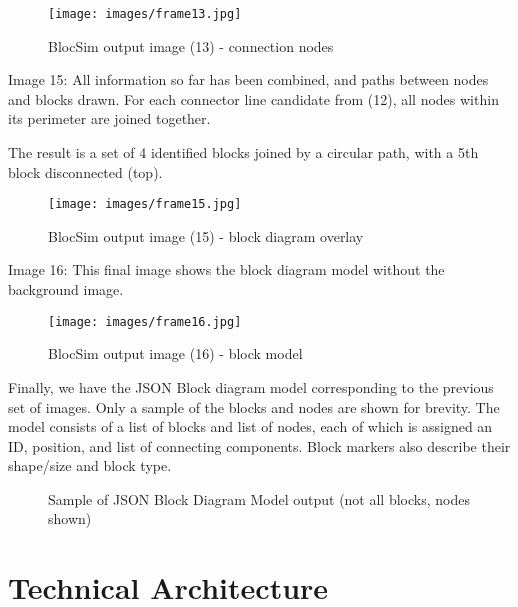 \begin{figure}[ht!]
\centering
\texttt{[image: images/frame13.jpg]}
\caption{BlocSim output image (13) - connection nodes \cite{blocsim}}
\label{im:frame13}
\end{figure}

\newpage
Image 15: All information so far has been combined, and paths between nodes and blocks drawn. For each connector line candidate from (12), all nodes within its perimeter are joined together. 

The result is a set of 4 identified blocks joined by a circular path, with a 5th block disconnected (top).

\begin{figure}[ht!]
\centering
\texttt{[image: images/frame15.jpg]}
\caption{BlocSim output image (15) - block diagram overlay \cite{blocsim}}
\label{im:frame15}
\end{figure}

\newpage
Image 16: This final image shows the block diagram model without the background image.

\begin{figure}[ht!]
\centering
\texttt{[image: images/frame16.jpg]}
\caption{BlocSim output image (16) - block model \cite{blocsim}}
\label{im:frame16}
\end{figure}

\clearpage
\newpage

Finally, we have the JSON Block diagram model corresponding to the previous set of images. Only a sample of the blocks and nodes are shown for brevity. The model consists of a list of blocks and list of nodes, each of which is assigned an ID, position, and list of connecting components. Block markers also describe their shape/size and block type.

\begin{figure}[ht!]
	\fontsize{8pt}{8pt}
	\singlespacing
	\begin{mdframed}
	\end{mdframed}
	\caption{Sample of JSON Block Diagram Model output (not all blocks, nodes shown)}
	\label{tab:json}
\end{figure}

\clearpage





\section{Technical Architecture}

